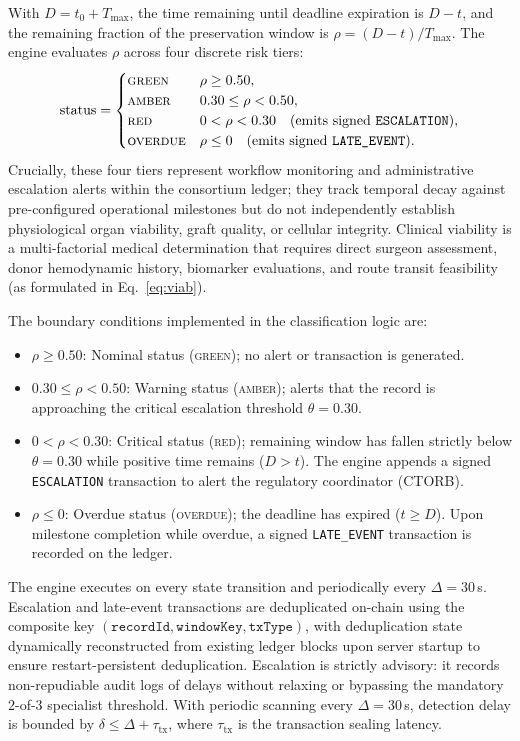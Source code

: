 \documentclass[journal]{IEEEtran}
\newcommand{\ctorb}{CTORB}
\begin{document}
With $D = t_0 + T_{\max}$, the time remaining until deadline expiration is $D - t$,
and the remaining fraction of the preservation window is $\rho = (D - t) / T_{\max}$.
The engine evaluates $\rho$ across four discrete risk tiers:
\begin{equation}
\mathrm{status}=
\begin{cases}
\textsc{green} & \rho \ge 0.50,\\
\textsc{amber} & 0.30 \le \rho < 0.50,\\
\textsc{red} & 0 < \rho < 0.30 \quad (\text{emits signed \texttt{ESCALATION}}),\\
\textsc{overdue} & \rho \le 0 \quad (\text{emits signed \texttt{LATE\_EVENT}}).
\end{cases}
\end{equation}
Crucially, these four tiers represent workflow monitoring and administrative
escalation alerts within the consortium ledger; they track temporal decay against
pre-configured operational milestones but do not independently establish physiological
organ viability, graft quality, or cellular integrity. Clinical viability is a
multi-factorial medical determination that requires direct surgeon assessment,
donor hemodynamic history, biomarker evaluations, and route transit feasibility
(as formulated in Eq.~\ref{eq:viab}).

The boundary conditions implemented in the classification logic are:
\begin{itemize}
  \item $\rho \ge 0.50$: Nominal status (\textsc{green}); no alert or transaction is generated.
  \item $0.30 \le \rho < 0.50$: Warning status (\textsc{amber}); alerts that the record is approaching the critical escalation threshold $\theta = 0.30$.
  \item $0 < \rho < 0.30$: Critical status (\textsc{red}); remaining window has fallen strictly below $\theta = 0.30$ while positive time remains ($D > t$). The engine appends a signed \texttt{ESCALATION} transaction to alert the regulatory coordinator (\ctorb).
  \item $\rho \le 0$: Overdue status (\textsc{overdue}); the deadline has expired ($t \ge D$). Upon milestone completion while overdue, a signed \texttt{LATE\_EVENT} transaction is recorded on the ledger.
\end{itemize}

The engine executes on every state transition and periodically every $\Delta = 30$\,s.
Escalation and late-event transactions are deduplicated on-chain using the composite
key $(\texttt{recordId}, \texttt{windowKey}, \texttt{txType})$, with deduplication
state dynamically reconstructed from existing ledger blocks upon server startup
to ensure restart-persistent deduplication. Escalation is strictly advisory: it
records non-repudiable audit logs of delays without relaxing or bypassing the
mandatory $2$-of-$3$ specialist threshold. With periodic scanning every $\Delta = 30$\,s,
detection delay is bounded by $\delta \le \Delta + \tau_{\mathrm{tx}}$, where $\tau_{\mathrm{tx}}$
is the transaction sealing latency.
\end{document}

